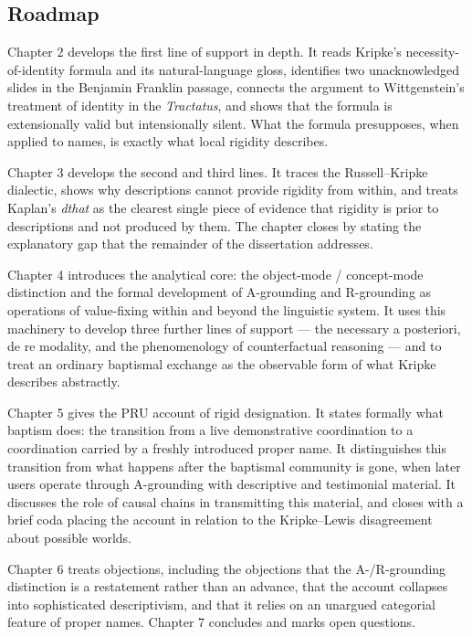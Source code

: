 \documentclass[12pt,a4paper]{article}
\begin{document}
\subsection{Roadmap}\label{roadmap}

Chapter 2 develops the first line of support in depth. It reads Kripke's necessity-of-identity formula and its natural-language gloss, identifies two unacknowledged slides in the Benjamin Franklin passage, connects the argument to Wittgenstein's treatment of identity in the \emph{Tractatus}, and shows that the formula is extensionally valid but intensionally silent. What the formula presupposes, when applied to names, is exactly what local rigidity describes.

Chapter 3 develops the second and third lines. It traces the Russell--Kripke dialectic, shows why descriptions cannot provide rigidity from within, and treats Kaplan's \emph{dthat} as the clearest single piece of evidence that rigidity is prior to descriptions and not produced by them. The chapter closes by stating the explanatory gap that the remainder of the dissertation addresses.

Chapter 4 introduces the analytical core: the object-mode / concept-mode distinction and the formal development of A-grounding and R-grounding as operations of value-fixing within and beyond the linguistic system. It uses this machinery to develop three further lines of support --- the necessary a posteriori, de re modality, and the phenomenology of counterfactual reasoning --- and to treat an ordinary baptismal exchange as the observable form of what Kripke describes abstractly.

Chapter 5 gives the PRU account of rigid designation. It states formally what baptism does: the transition from a live demonstrative coordination to a coordination carried by a freshly introduced proper name. It distinguishes this transition from what happens after the baptismal community is gone, when later users operate through A-grounding with descriptive and testimonial material. It discusses the role of causal chains in transmitting this material, and closes with a brief coda placing the account in relation to the Kripke--Lewis disagreement about possible worlds.

Chapter 6 treats objections, including the objections that the A-/R-grounding distinction is a restatement rather than an advance, that the account collapses into sophisticated descriptivism, and that it relies on an unargued categorial feature of proper names. Chapter 7 concludes and marks open questions.
\end{document}
